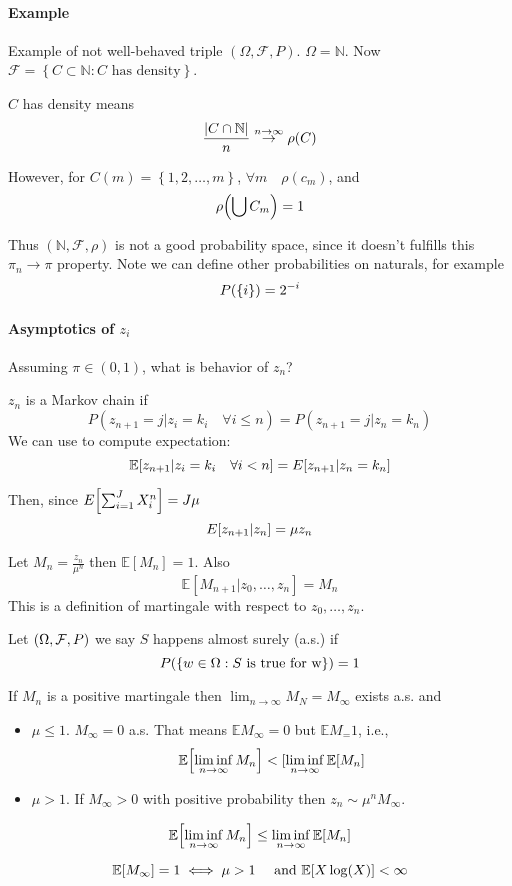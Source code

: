 


\paragraph{Example}
Example of not well-behaved triple $(\Omega, \mathcal{F}, P)$. $\Omega =\mathbb{N}$. Now $\mathcal{F} = \left\{  C\subset \mathbb{N} : C \text{ has density} \right\}$.

$C$ has density means 
$$\frac{\abs{C \cap \mathbb{N}}}{n} \stackrel{n\to \infty}{\to} \rho(C)$$

However, for $C(m) = \left\{  1,2,\dots, m \right\}$, $\forall m \quad \rho(c_m)$, and 
$$\rho\qty(\bigcup C_m ) = 1$$

Thus $(\mathbb{N}, \mathcal{F}, \rho)$ is not a good probability space, since it doesn't fulfills this
$\pi_n\to \pi$ property. Note we can define other probabilities on naturals, for example
$$P\qty(\left\{ i \right\}) = 2^{-i}$$


\paragraph{Asymptotics of $z_i$ }
Assuming $\pi \in (0,1)$, what is behavior of $z_n$?
\begin{definition}
	$z_n$ is a Markov chain if 
	$$P(z_{n+1}=j|z_i=k_i \quad \forall i\leq n) = P(z_{n+1} = j | z_n=k_n)$$
	We can use to compute expectation:
	$$\mathbb{E}[z_{n+1}|z_i=k_i \quad \forall i<n] = E\qty[z_{n+1}|z_n=k_n]$$
\end{definition}

Then, since $E\qty[\sum_{i=1}^J X_i^n] = J\mu$
$$E\qty[z_{n+1}|z_n] = \mu z_n$$

Let $M_n = \frac{z_n}{\mu^n}$ then $\mathbb{E}[M_n] = 1$. Also
$$\mathbb{E}[M_{n+1}|z_0,\dots, z_n] = M_n$$
This is a definition of martingale with respect to $z_0, \dots, z_n$.

Let $\qty(\Omega, \mathcal{F}, P)$ we say $S$ happens almost surely (a.s.) if $$P\qty(\left\{ w\in \Omega : S \text{ is true for w} \right\}) = 1$$
\begin{theorem}
	If $M_n$ is a positive martingale then $\lim_{n\to \infty} M_N=M_\infty$ exists a.s. and 
	\begin{itemize}
		\item $\mu \leq 1$. $M_\infty =0 $ a.s. That means $\mathbb{E}M_\infty = 0$ but $\mathbb{E} M_ = 1$, i.e., 
		$$\mathbb{E}\qty[\liminf_{n\to \infty} M_n] < [\liminf_{n\to \infty} \mathbb{E}\qty[M_n]$$ 
		\item $\mu>1$. If $M_\infty > 0$ with positive probability then $z_n \sim \mu^n M_\infty$.  
	\end{itemize}
\end{theorem}


\begin{lemma}
	$$\mathbb{E}\qty[\liminf_{n\to \infty} M_n] \leq \liminf_{n\to \infty} \mathbb{E}\qty[M_n]$$ 
\end{lemma}

\begin{theorem}
	$$\mathbb{E} \qty[M_\infty] = 1 \iff \mu>1 \quad \text{ and } \mathbb{E}\qty[X \log(X)] < \infty$$
\end{theorem}
